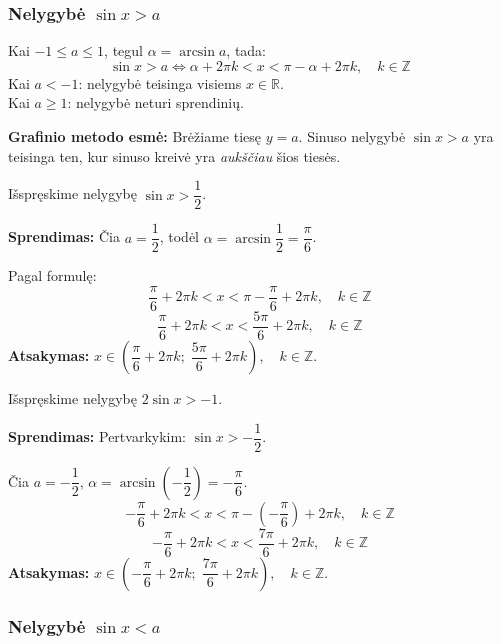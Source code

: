 \subsubsection*{Nelygybė \texorpdfstring{$\sin x > a$}{sin x > a}}

\begin{tcolorbox}[colback=green!5!white, colframe=green!60!black, title=Formulė -- $\sin x > a$]
Kai $-1 \leq a \leq 1$, tegul $\alpha = \arcsin a$, tada:
\[
\sin x > a \iff \alpha + 2\pi k < x < \pi - \alpha + 2\pi k, \quad k \in \mathbb{Z}
\]
Kai $a < -1$: nelygybė teisinga visiems $x \in \mathbb{R}$.\\
Kai $a \geq 1$: nelygybė neturi sprendinių.
\end{tcolorbox}

\textbf{Grafinio metodo esmė:} Brėžiame tiesę $y = a$. Sinuso nelygybė $\sin x > a$ yra teisinga ten, kur sinuso kreivė yra \emph{aukščiau} šios tiesės.

\begin{example}
Išspręskime nelygybę $\sin x > \dfrac{1}{2}$.

\textbf{Sprendimas:} Čia $a = \dfrac{1}{2}$, todėl $\alpha = \arcsin \dfrac{1}{2} = \dfrac{\pi}{6}$.

Pagal formulę:
\[
\frac{\pi}{6} + 2\pi k < x < \pi - \frac{\pi}{6} + 2\pi k, \quad k \in \mathbb{Z}
\]
\[
\frac{\pi}{6} + 2\pi k < x < \frac{5\pi}{6} + 2\pi k, \quad k \in \mathbb{Z}
\]
\textbf{Atsakymas:} $x \in \left(\dfrac{\pi}{6} + 2\pi k;\; \dfrac{5\pi}{6} + 2\pi k\right), \quad k \in \mathbb{Z}$.
\end{example}

\begin{example}
Išspręskime nelygybę $2\sin x > -1$.

\textbf{Sprendimas:} Pertvarkykim: $\sin x > -\dfrac{1}{2}$.

Čia $a = -\dfrac{1}{2}$, $\alpha = \arcsin\!\left(-\dfrac{1}{2}\right) = -\dfrac{\pi}{6}$.
\[
-\frac{\pi}{6} + 2\pi k < x < \pi - \left(-\frac{\pi}{6}\right) + 2\pi k, \quad k \in \mathbb{Z}
\]
\[
-\frac{\pi}{6} + 2\pi k < x < \frac{7\pi}{6} + 2\pi k, \quad k \in \mathbb{Z}
\]
\textbf{Atsakymas:} $x \in \left(-\dfrac{\pi}{6} + 2\pi k;\; \dfrac{7\pi}{6} + 2\pi k\right), \quad k \in \mathbb{Z}$.
\end{example}

\subsubsection*{Nelygybė \texorpdfstring{$\sin x < a$}{sin x < a}}

